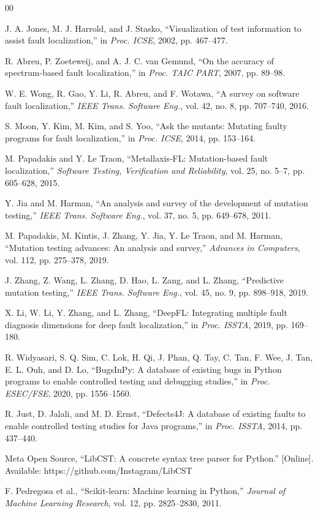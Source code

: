 \documentclass[10pt,conference]{IEEEtran}
\begin{document}
\begin{thebibliography}{00}

 J. A. Jones, M. J. Harrold, and J. Stasko, ``Visualization of test information to assist fault localization,'' in \emph{Proc. ICSE}, 2002, pp. 467--477.

 R. Abreu, P. Zoeteweij, and A. J. C. van Gemund, ``On the accuracy of spectrum-based fault localization,'' in \emph{Proc. TAIC PART}, 2007, pp. 89--98.

 W. E. Wong, R. Gao, Y. Li, R. Abreu, and F. Wotawa, ``A survey on software fault localization,'' \emph{IEEE Trans. Software Eng.}, vol. 42, no. 8, pp. 707--740, 2016.

 S. Moon, Y. Kim, M. Kim, and S. Yoo, ``Ask the mutants: Mutating faulty programs for fault localization,'' in \emph{Proc. ICSE}, 2014, pp. 153--164.

 M. Papadakis and Y. Le Traon, ``Metallaxis-FL: Mutation-based fault localization,'' \emph{Software Testing, Verification and Reliability}, vol. 25, no. 5--7, pp. 605--628, 2015.

 Y. Jia and M. Harman, ``An analysis and survey of the development of mutation testing,'' \emph{IEEE Trans. Software Eng.}, vol. 37, no. 5, pp. 649--678, 2011.

 M. Papadakis, M. Kintis, J. Zhang, Y. Jia, Y. Le Traon, and M. Harman, ``Mutation testing advances: An analysis and survey,'' \emph{Advances in Computers}, vol. 112, pp. 275--378, 2019.

 J. Zhang, Z. Wang, L. Zhang, D. Hao, L. Zang, and L. Zhang, ``Predictive mutation testing,'' \emph{IEEE Trans. Software Eng.}, vol. 45, no. 9, pp. 898--918, 2019.

 X. Li, W. Li, Y. Zhang, and L. Zhang, ``DeepFL: Integrating multiple fault diagnosis dimensions for deep fault localization,'' in \emph{Proc. ISSTA}, 2019, pp. 169--180.

 R. Widyasari, S. Q. Sim, C. Lok, H. Qi, J. Phan, Q. Tay, C. Tan, F. Wee, J. Tan, E. L. Ouh, and D. Lo, ``BugsInPy: A database of existing bugs in Python programs to enable controlled testing and debugging studies,'' in \emph{Proc. ESEC/FSE}, 2020, pp. 1556--1560.

 R. Just, D. Jalali, and M. D. Ernst, ``Defects4J: A database of existing faults to enable controlled testing studies for Java programs,'' in \emph{Proc. ISSTA}, 2014, pp. 437--440.

 Meta Open Source, ``LibCST: A concrete syntax tree parser for Python.'' [Online]. Available: https://github.com/Instagram/LibCST

 F. Pedregosa et al., ``Scikit-learn: Machine learning in Python,'' \emph{Journal of Machine Learning Research}, vol. 12, pp. 2825--2830, 2011.

\end{thebibliography}
\end{document}

